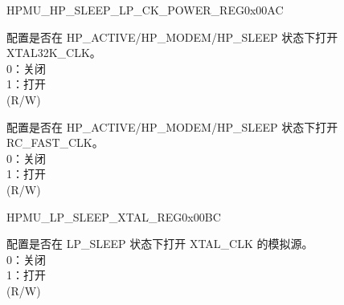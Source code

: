 \begin{register}{H}{PMU\_HP\_SLEEP\_LP\_CK\_POWER\_REG}{0x00AC}\label{regdesc:PMUHPSLEEPLPCKPOWERREG}
%
%
%
%
%
\regnewline%
\begin{regdesc}\begin{reglist}
\label{fielddesc:PMUHPSLEEPXPDXTAL32K}\item [PMU\_HP\_SLEEP\_XPD\_XTAL32K] 配置是否在 HP\_ACTIVE/HP\_MODEM/HP\_SLEEP 状态下打开 XTAL32K\_CLK。\\
0：关闭\\
1：打开\\
(R/W)
\label{fielddesc:PMUHPSLEEPXPDFOSCCLK}\item [PMU\_HP\_SLEEP\_XPD\_FOSC\_CLK] 配置是否在 HP\_ACTIVE/HP\_MODEM/HP\_SLEEP 状态下打开 RC\_FAST\_CLK。\\
0：关闭\\
1：打开\\
(R/W)
\end{reglist}\end{regdesc}
\end{register}





\begin{register}{H}{PMU\_LP\_SLEEP\_XTAL\_REG}{0x00BC}\label{regdesc:PMULPSLEEPXTALREG}
%
%
\regnewline%
\begin{regdesc}\begin{reglist}
\label{fielddesc:PMULPSLEEPXPDXTAL}\item [PMU\_LP\_SLEEP\_XPD\_XTAL] 配置是否在 LP\_SLEEP 状态下打开 XTAL\_CLK 的模拟源。\\
0：关闭\\
1：打开\\
(R/W)
\end{reglist}\end{regdesc}
\end{register}


